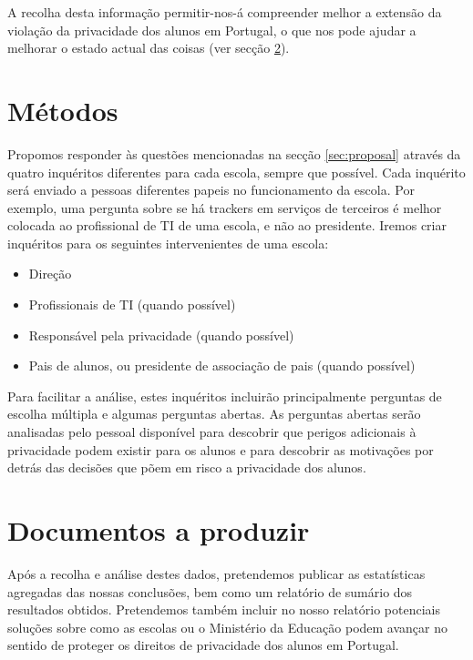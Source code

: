 \documentclass[twoside,twocolumn]{article}
\begin{document}
A recolha desta informação permitir-nos-á compreender melhor a extensão da violação da privacidade dos alunos em Portugal, o que nos pode ajudar a melhorar o estado actual das coisas (ver secção \ref{sec:deliverables}).


\section{Métodos}

Propomos responder às questões mencionadas na secção \ref{sec:proposal} através da quatro inquéritos diferentes para cada escola, sempre que possível. Cada inquérito será enviado a pessoas diferentes papeis no funcionamento da escola. Por exemplo, uma pergunta sobre se há trackers em serviços de terceiros é melhor colocada ao profissional de TI de uma escola, e não ao presidente. Iremos criar inquéritos para os seguintes intervenientes de uma escola:

\begin{itemize}
\itemsep0em
\item Direção
\item Profissionais de TI (quando possível)
\item Responsável pela privacidade (quando possível)
\item Pais de alunos, ou presidente de associação de pais (quando possível)
\end{itemize}


Para facilitar a análise, estes inquéritos incluirão principalmente perguntas de escolha múltipla e algumas perguntas abertas. As perguntas abertas serão analisadas pelo pessoal disponível para descobrir que perigos adicionais à privacidade podem existir para os alunos e para descobrir as motivações por detrás das decisões que põem em risco a privacidade dos alunos.


\section{Documentos a produzir}
\label{sec:deliverables}

Após a recolha e análise destes dados, pretendemos publicar as estatísticas agregadas das nossas conclusões, bem como um relatório de sumário dos resultados obtidos. Pretendemos também incluir no nosso relatório potenciais soluções sobre como as escolas ou o Ministério da Educação podem avançar no sentido de proteger os direitos de privacidade dos alunos em Portugal.
\end{document}

